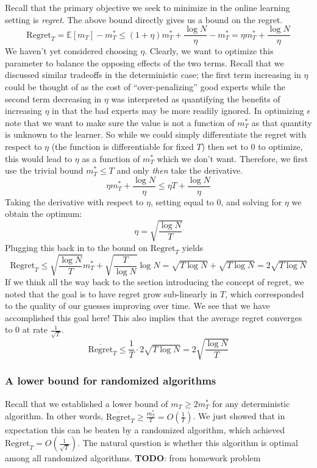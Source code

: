 \documentclass[12pt]{article}
\newcommand{\E}{\mathbb{E}}
\begin{document}
Recall that the primary objective we seek to minimize in the online learning setting is \textit{regret}. The above bound directly gives us a bound on the regret. 
\[\text{Regret}_T = \E[m_T] - m_T^* \leq (1 + \eta)m_T^{*} + \frac{\log N}{\eta} - m_T^* = \eta m_T^* + \frac{\log N}{\eta}\]
We haven't yet considered choosing $\eta$. Clearly, we want to optimize this parameter to balance the opposing effects of the two terms. Recall that 
we discussed similar tradeoffs in the deterministic case; the first term increasing in $\eta$ could be thought of as the cost of ``over-penalizing'' good experts
while the second term decreasing in $\eta$ was interpreted as quantifying the benefits of increasing $\eta$ in that the bad experts may be more 
readily ignored. In optimizing $\epsilon$ note that we want to make sure the value is not a function of $m_T^*$ as that quantity is unknown to the learner. 
So while we could simply differentiate the regret with respect to $\eta$ (the function is differentiable for fixed $T$) then set to $0$ to optimize, this would lead
to $\eta$ as a function of $m_T^*$ which we don't want. Therefore, we first use the trivial bound $m_T^* \leq T$ and only \textit{then} take the derivative. 
\[\eta m_T^* + \frac{\log N}{\eta} \leq \eta T + \frac{\log N}{\eta}\]
Taking the derivative with respect to $\eta$, setting equal to $0$, and solving for $\eta$ we obtain the optimum:
\[\eta = \sqrt{\frac{\log N}{T}}\]
Plugging this back in to the bound on $\text{Regret}_T$ yields
\[\text{Regret}_T \leq  \sqrt{\frac{\log N}{T}} m_T^* +  \sqrt{\frac{T}{\log N}}\log N = \sqrt{T \log N} + \sqrt{T \log N} = 2\sqrt{T \log N}\]
If we think all the way back to the section introducing the concept of regret, we noted that the goal is to have regret grow sub-linearly in $T$, which corresponded 
to the quality of our guesses improving over time. We see that we have accomplished this goal here! This also implies that the average regret converges to $0$
at rate $\frac{1}{\sqrt{T}}$. 
\[\overline{\text{Regret}}_T \leq \frac{1}{T} \cdot 2\sqrt{T \log N} = 2\sqrt{\frac{\log N}{T}}\]

\subsubsection{A lower bound for randomized algorithms}
Recall that we established a lower bound of $m_T \geq 2m_T^*$ for any deterministic algorithm. In other words, $\overline{\text{Regret}}_T \geq \frac{m_T^*}{T} = O\left(\frac{1}{T}\right)$.
We just showed that in expectation this can be beaten by 
a randomized algorithm, which achieved $\overline{\text{Regret}}_T = O\left(\frac{1}{\sqrt{T}}\right)$. The natural question is whether this algorithm is optimal among all randomized 
algorithms. 
\textbf{TODO}: from homework problem 
\end{document}
